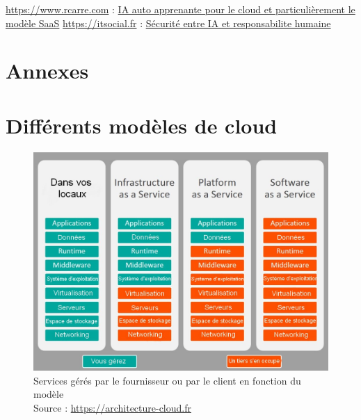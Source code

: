 \documentclass[a4paper, 12pt]{article}
\begin{document}
\begin{spacing}{1.1}
\begin{thebibliography}{3}
    \bibitem{} \url{https://www.rcarre.com} : \href{https://www.rcarre.com/blog/intelligence-artificielle-auto-apprenante-pour-le-cloud-and-saas/}{IA auto apprenante pour le cloud et particulièrement le modèle SaaS}
    \bibitem{} \url{https://itsocial.fr} : \href{https://itsocial.fr/partenaires/oracle-partenaire/tribunes-oracle/securite-du-cloud-entre-intelligence-artificielle-et-responsabilite-humaine/}{Sécurité entre IA et responsabilite humaine}
  \end{thebibliography}

  \newpage
  \section*{Annexes}
  \appendix
    \section{Différents modèles de cloud}
      \begin{figure}[h]
        \centering
        \includegraphics[scale=.4]{img/modeles.jpg}
        \caption{Services gérés par le fournisseur ou par le client en
        fonction du modèle \\ Source : \url{https://architecture-cloud.fr}}
      \end{figure}
      \label{modeles}
  \end{spacing}
\end{document}

